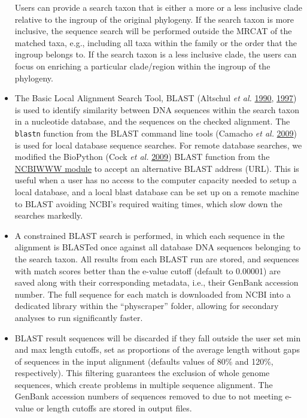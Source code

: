 \documentclass[]{article}
\begin{document}
\begin{itemize}
  Users can provide a search taxon that is either a more or a less inclusive
  clade relative to the ingroup of the original phylogeny. If the search taxon is more inclusive, the sequence search will be performed outside the MRCAT of the matched taxa, e.g., including all taxa within
  the family or the order that the ingroup belongs to. If the search taxon is a less inclusive clade, the users can focus on enriching a particular clade/region within the ingroup of the phylogeny.
\item
  The Basic Local Alignment Search Tool, BLAST (Altschul \emph{et al.} \protect\hyperlink{ref-altschul1990basic}{1990}, \protect\hyperlink{ref-altschul1997gapped}{1997}) is used to identify
  similarity between DNA sequences within the search taxon in a nucleotide
  database, and the sequences on the checked alignment.
  The \texttt{blastn} function from the BLAST command line tools (Camacho \emph{et al.} \protect\hyperlink{ref-camacho2009blast}{2009}) is used for local database sequence searches.
  For remote database searches, we modified the BioPython (Cock \emph{et al.} \protect\hyperlink{ref-cock2009biopython}{2009}) BLAST function from the \href{https://biopython.org/DIST/docs/api/Bio.Blast.NCBIWWW-module.html}{NCBIWWW module} to accept an alternative BLAST address (URL). This is useful when a user has no access to the computer capacity needed to setup a local database, and a local blast database can be set up on a remote machine to BLAST avoiding NCBI's required waiting times, which slow down the searches markedly.
\item
  A constrained BLAST search is performed, in which each sequence
  in the alignment is BLASTed once against all database DNA sequences belonging to the search
  taxon. All results from each BLAST run are stored, and sequences with match scores better than the e-value cutoff (default to 0.00001) are saved
  along with their corresponding metadata, i.e., their GenBank accession number.
  The full sequence for each match is downloaded from NCBI into a dedicated library within the ``physcraper'' folder, allowing for secondary analyses to run significantly faster.
\item
  BLAST result sequences will be discarded if they fall outside the user set min and max length cutoffs, set as proportions of the average length without gaps of sequences in the input alignment (defaults values of 80\% and 120\%, respectively).
  This filtering guarantees the exclusion of whole genome sequences, which create problems in multiple sequence alignment.
  The GenBank accession numbers of sequences removed to due to not meeting e-value or length cutoffs are stored in output files.

\end{itemize}
\end{document}
